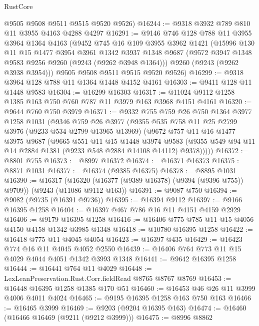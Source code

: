 \begin{lexlean}{RustCore}
\begin{coremodule}
      @9505
      @9508
      @9511
      @9515
      @9520
      @9526)
@16244 := @9318 @3932 @789 @810 @11 @3955 @4163 @4288 @4297
@16291 := @9146
    @746
    @128
    @788
    @11
    @3955
    @3964
    @1364
    @4163
    (@9452
      @745
      @16
      @109
      @3955
      @3962
      @1421
      (@15996
        @130
        @11
        @15
        @1477
        @3954
        @3961
        @1342
        @3937
        @1348
        @9687
        (@9572 @3947 @1348 @9583 @9256 @9260 (@9243 (@9262 @3948 @1364)))
        @9260
        (@9243 (@9262 @3938 @3954)))
      @9505
      @9508
      @9511
      @9515
      @9520
      @9526)
@16299 := @9318 @3964 @128 @788 @11 @1364 @1448 @4152 @4161
@16303 := @9411 @128 @11 @1448 @9583
@16304 := @16299 @16303
@16317 := @11024 @9112 @1258 @1385 @163 @750 @760 @787 @11 @3979 @163 @3968 @4151 @4161
@16320 := @9644 @760 @750 @3979
@16371 := @9332
    @755
    @759
    @26
    @750
    @1364
    @3977
    @1258
    @1031
    (@9346
      @759
      @26
      @3977
      (@9355
        @535
        @758
        @11
        @25
        @2799
        @3976
        (@9233 @534 @2799 @13965 @13969)
        (@9672
          @757
          @11
          @16
          @1477
          @3975
          @9687
          (@9665
            @551
            @11
            @15
            @1448
            @3974
            @9583
            (@9355 @549 @94 @11 @14 @2884 @1381 (@9233 @548 @2884 @14108 @14112) @9378)))))
@16372 := @8801 @755
@16373 := @8997 @16372
@16374 := @16371 @16373
@16375 := @8871 @1031
@16377 := @16374 (@9385 @16375)
@16378 := @8895 @1031
@16390 := @16317
    (@16320 (@16377 (@9389 @16378) (@9394 (@9396 @755)) @9709))
    (@9243 (@11086 @9112 @163))
@16391 := @9087 @750
@16394 := @9082 (@9735 (@16391 @9736))
@16395 := @16394 @9112
@16397 := @9166 @16395 @1258
@16404 := @16397 @467 @786 @16 @11 @4151 @4159 @2929
@16406 := @9179 @16395 @1258
@16416 := @16406 @775 @785 @11 @15 @4056 @4150 @4158 @1342 @3985 @1348
@16418 := @10780 @16395 @1258
@16422 := @16418 @775 @11 @4045 @4054
@16423 := @16397 @435
@16429 := @16423 @774 @16 @11 @4045 @4052 @2550
@16439 := @16406 @764 @773 @11 @15 @4029 @4044 @4051 @1342 @3993 @1348
@16441 := @9642 @16395 @1258
@16444 := @16441 @764 @11 @4029
@16448 := LexLeanPreservation.Rust.Corr.fieldRead @8765 @8767 @8769
@16453 := @16448 @16395 @1258 @1385 @170 @51
@16460 := @16453 @46 @26 @11 @3999 @4006 @4011 @4024
@16465 := @9195 @16395 @1258 @163 @750 @163
@16466 := @16465 @3999
@16469 := @9203 (@9204 @16395 @163)
@16474 := @16460 (@16466 @16469 (@9211 (@9212 @3999)))
@16475 := @8996 @8862

\end{coremodule}
\end{lexlean}
